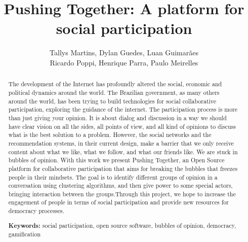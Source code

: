 \documentclass{llncs}
\begin{document}
\sloppy
\title{Pushing Together: A platform for social participation}

\author{Tallys Martins, Dylan Guedes, Luan Guimarães\\
        Ricardo Poppi, Henrique Parra, Paulo Meirelles}



\maketitle
\begin{abstract}

The development of the Internet has profoundly altered the social, economic
and political dynamics around the world. The Brazilian government, as many
others around the world, has been trying to build technologies for social
collaborative participation, exploring the guidance of the internet.
The participation process is more than just giving
your opinion. It is about dialog and discussion in a way we should have clear
vision on all the sides, all points of view, and all kind of opinions to
discuss what is the best solution to a problem. However, the social networks
and the recommendation systems, in their current design, make a barrier that we
only receive content about what we like, what we follow, and what our friends
like. We are stuck in bubbles of opinion.  With this work we present Pushing
Together, an Open Source platform for collaborative participation that aims for
breaking the bubbles that freezes people in their mindsets. The goal is to
identify different groups of opinion in a conversation using clustering
algorithms, and then give power to some special actors, bringing interaction
between the groups.Through this project, we hope to increase the engagement of
people in terms of social participation and provide new resources for democracy
processes.

\textbf{Keywords:} social participation, open source software, bubbles of
opinion, democracy, gamification
\end{abstract}
\end{document}
